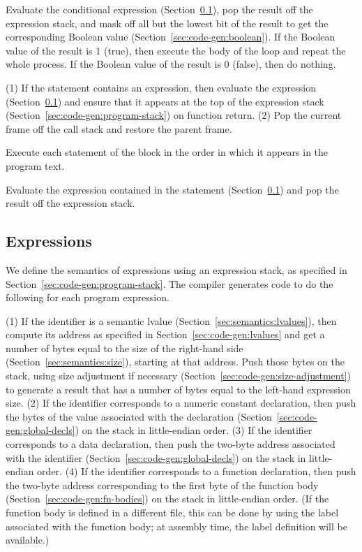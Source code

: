 \documentclass[10pt]{article}
\begin{document}
 Evaluate the conditional expression
(Section~\ref{sec:code-gen:expressions}), pop the result off the
expression stack, and mask off all but the lowest bit of the result to
get the corresponding Boolean value
(Section~\ref{sec:code-gen:boolean}).  If the Boolean value of the
result is 1 (true), then execute the body of the loop and repeat the
whole process.  If the Boolean value of the result is 0 (false), then
do nothing.

 (1) If the statement contains an
expression, then evaluate the expression
(Section~\ref{sec:code-gen:expressions}) and ensure that it appears at
the top of the expression stack
(Section~\ref{sec:code-gen:program-stack}) on function return.  (2)
Pop the current frame off the call stack and restore the parent frame.

 Execute each statement of the block in the
order in which it appears in the program text.

 Evaluate the expression contained in
the statement (Section~\ref{sec:code-gen:expressions}) and pop the
result off the expression stack.

\subsection{Expressions}
\label{sec:code-gen:expressions}

We define the semantics of expressions using an expression stack, as
specified in Section~\ref{sec:code-gen:program-stack}.  The compiler
generates code to do the following for each program expression.

 (1) If the identifier is a semantic lvalue
(Section~\ref{sec:semantics:lvalues}), then compute its address as
specified in Section~\ref{sec:code-gen:lvalues} and get a number of
bytes equal to the size of the right-hand side
(Section~\ref{sec:semantics:size}), starting at that address.  Push
those bytes on the stack, using size adjustment if necessary
(Section~\ref{sec:code-gen:size-adjustment}) to generate a result that
has a number of bytes equal to the left-hand expression size. (2) If
the identifier corresponds to a numeric constant declaration, then
push the bytes of the value associated with the declaration
(Section~\ref{sec:code-gen:global-decls}) on the stack in
little-endian order.  (3) If the identifier corresponds to a data
declaration, then push the two-byte address associated with the
identifier (Section~\ref{sec:code-gen:global-decls}) on the stack in
little-endian order. (4) If the identifier corresponds to a function
declaration, then push the two-byte address corresponding to the first
byte of the function body (Section~\ref{sec:code-gen:fn-bodies}) on
the stack in little-endian order.  (If the function body is defined in
a different file, this can be done by using the label associated with
the function body; at assembly time, the label definition will be
available.)
\end{document}
